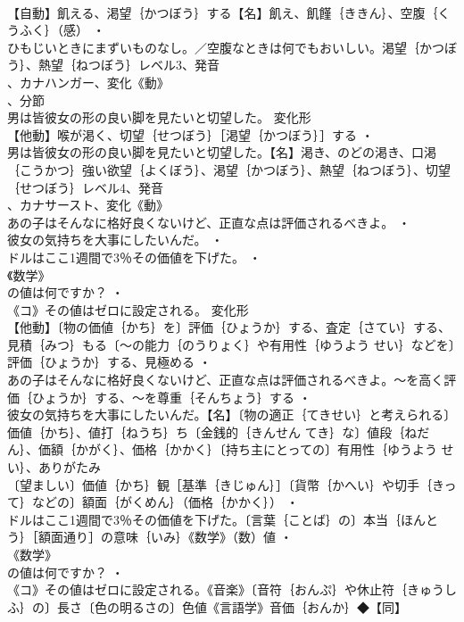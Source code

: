 \documentclass[8pt]{extreport}
\begin{document}
\begin{CJK}{UTF8}{min}
\\	【自動】飢える、渇望｛かつぼう｝する【名】飢え、飢饉｛ききん｝、空腹｛くうふく｝（感） ・
\\	ひもじいときにまずいものなし。／空腹なときは何でもおいしい。渇望｛かつぼう｝、熱望｛ねつぼう｝レベル3、発音
\\	、カナハンガー、変化《動》
\\	、分節
\\	男は皆彼女の形の良い脚を見たいと切望した。	変化形 
\\	【他動】喉が渇く、切望｛せつぼう｝［渇望｛かつぼう｝］する ・
\\	男は皆彼女の形の良い脚を見たいと切望した。【名】渇き、のどの渇き、口渇｛こうかつ｝強い欲望｛よくぼう｝、渇望｛かつぼう｝、熱望｛ねつぼう｝、切望｛せつぼう｝レベル4、発音
\\	、カナサースト、変化《動》
\\	あの子はそんなに格好良くないけど、正直な点は評価されるべきよ。 ・
\\	彼女の気持ちを大事にしたいんだ。 ・
\\	ドルはここ1週間で3％その価値を下げた。 ・
\\	《数学》
\\	の値は何ですか？ ・
\\	《コ》その値はゼロに設定される。	変化形 
\\	【他動】〔物の価値｛かち｝を〕評価｛ひょうか｝する、査定｛さてい｝する、見積｛みつ｝もる〔～の能力｛のうりょく｝や有用性｛ゆうよう せい｝などを〕評価｛ひょうか｝する、見極める ・
\\	あの子はそんなに格好良くないけど、正直な点は評価されるべきよ。～を高く評価｛ひょうか｝する、～を尊重｛そんちょう｝する ・
\\	彼女の気持ちを大事にしたいんだ。【名】〔物の適正｛てきせい｝と考えられる〕価値｛かち｝、値打｛ねうち｝ち〔金銭的｛きんせん てき｝な〕値段｛ねだん｝、価額｛かがく｝、価格｛かかく｝〔持ち主にとっての〕有用性｛ゆうよう せい｝、ありがたみ
\\	〔望ましい〕価値｛かち｝観［基準｛きじゅん｝］〔貨幣｛かへい｝や切手｛きって｝などの〕額面｛がくめん｝（価格｛かかく｝） ・
\\	ドルはここ1週間で3％その価値を下げた。〔言葉｛ことば｝の〕本当｛ほんとう｝［額面通り］の意味｛いみ｝《数学》（数）値 ・
\\	《数学》
\\	の値は何ですか？ ・
\\	《コ》その値はゼロに設定される。《音楽》〔音符｛おんぷ｝や休止符｛きゅうしふ｝の〕長さ〔色の明るさの〕色値《言語学》音価｛おんか｝◆【同】

\end{CJK}
\end{document}
